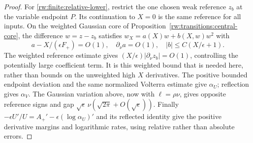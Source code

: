 \begin{proof}
For \eqref{rw:finite:relative-lower}, restrict the one chosen weak
reference $z_b$ at the variable endpoint $P$. Its continuation to
$X=0$ is the same reference for all inputs. On the weighted Gaussian
core of Proposition~\ref{rw:transitions:central-core}, the difference
$w=z-z_b$ satisfies $w_X=a(X)w+b(X,w)w^2$ with
\[
 a-X/(\epsilon F_+)=O(1),\quad
 \partial_\nu a=O(1),\quad |b|\le C(X/\epsilon+1).
\]
The weighted reference estimate gives
$(X/\epsilon)|\partial_\nu z_b|=O(1)$, controlling the potentially
large coefficient term. It is this weighted bound that is needed here,
rather than bounds on the unweighted high $X$ derivatives.
The positive bounded endpoint deviation and the same normalized
Volterra estimate give $\alpha_U$; reflection gives $\alpha_V$.
The Gaussian variation above, now with $\ell=\rho\nu$, gives
opposite reference signs and gap
$\sqrt\epsilon\,\nu(\sqrt{2\pi}+O(\sqrt\epsilon))$.
Finally $-\epsilon U'/U=A_+'-\epsilon(\log\alpha_U)'$ and its
reflected identity give the positive derivative margins and logarithmic
rates, using relative rather than absolute errors.
\end{proof}

